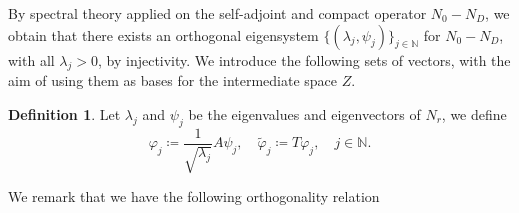 \documentclass[10pt, a4paper, twoside, openright]{book}
\theoremstyle{definition}
\newtheorem{definition}[subsection]{Definition}
\theoremstyle{plain}
\theoremstyle{plain}
\theoremstyle{plain}
\theoremstyle{plain}
\theoremstyle{plain}
\theoremstyle{plain}
\theoremstyle{plain}
\theoremstyle{plain}
\let\phi\varphi
\begin{document}
% 
% 
By spectral theory applied on the self-adjoint and compact operator ${N_0}- {N_D}$, we obtain that there exists
an orthogonal eigensystem $\{(\lambda_j, \psi_j)\}_{j\in\mathbb{N}}$ for ${N_0} - {N_D}$,
with all $\lambda_j>0$, by injectivity.
We introduce the following sets of vectors, with the aim of using them as bases for the intermediate space $Z$.
\begin{definition}
Let $\lambda_j$ and $\psi_j$ be the eigenvalues and eigenvectors of ${N_r}$, we define
\begin{equation}
 \phi_j\coloneqq \frac{1}{\sqrt{\lambda_j}}A\psi_j, \quad \tilde{\phi}_j\coloneqq T\phi_j,\quad j\in\mathbb{N}. 
\end{equation}
\end{definition}
We remark that we have the following orthogonality relation
\end{document}

